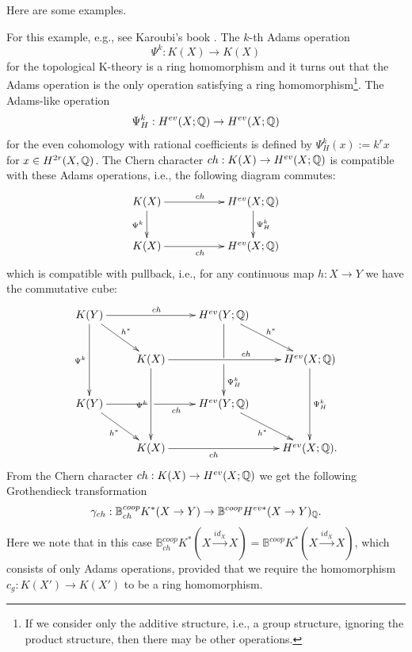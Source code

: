 \documentclass[a4paper]{amsart}
\begin{document}
Here are some examples.
\begin{ex}\label{Adam} For this example, e.g., see Karoubi's book \cite[IV, 7.13 Theorem and V, 3.37 Theorem]{Kar}.
The $k$-th Adams operation 
$$\Psi^k:K(X) \to K(X)$$
 for the topological K-theory is a ring homomorphism and it turns out that the Adams operation is the only operation satisfying a ring homomorphism\footnote{If we consider only the additive structure, i.e., a group structure, ignoring the product structure, then there may be other operations.}. The Adams-like operation 
$$\Psi^k_H:H^{ev}(X;\mathbb Q) \to H^{ev}(X;\mathbb Q)$$
 for the even cohomology with rational coefficients is defined by
 $\Psi^k_H(x) := k^r x$ for $x \in H^{2r}(X, \mathbb Q)$. The Chern character $ch:K(X) \to H^{ev}(X ;\mathbb Q)$ is compatible with these Adams operations, i.e., the following diagram commutes:
$$
\xymatrix
{
K(X) \ar[d]_{\Psi^k}\ar[rr]^{ch}  && H^{ev}(X;\bQ) \ar[d]^{\Psi^k_H}\\
K(X) \ar[rr]_{ch} && H^{ev}(X;\bQ)
}
$$
which is compatible with pullback, i.e., for any continuous map $h:X \to Y$ we have the commutative cube:
\begin{equation*}
\xymatrix
{ K(Y) \ar[dd]_{\Psi^k } \ar[rd]^{h^*} \ar[rr]^{ch} && H^{ev}(Y;\bQ) \ar'[d][dd]^{\Psi^k_H} \ar[rd]^{h^*} \\
& K(X) \ar[dd]_{\Psi^k} \ar[rr]^{ \hspace{1cm} ch}  &&  H^{ev}(X;\bQ)\ar[dd]^{\Psi^k_H} \\
K(Y)\ar'[r] [rr]_{ch \quad \quad }  \ar[rd]_{h^*} && H^{ev}(Y;\bQ)\ar[rd]_{h^*} \\
& K(X) \ar[rr] _{ch \quad \quad  \quad }  &&  H^{ev}(X;\bQ).
}
\end{equation*}
 From the Chern character $ch:K(X) \to H^{ev}(X ;\mathbb Q)$ we get the following Grothendieck transformation
$$\gamma_{ch}: \mathbb B^{coop}_{ch} K^*(X \to Y)  \to  \mathbb B^{coop} H^{ev *}(X \to Y)_{\mathbb Q}.$$
Here we note that in this case $\mathbb B^{coop}_{ch} K^*(X \xrightarrow {id_X} X) = \mathbb B^{coop} K^*(X \xrightarrow {id_X} X)$, which consists of only Adams operations, provided that we require the homomorphism $c_g:K(X') \to K(X')$ to be a ring homomorphism. 
\end{ex}
\end{document}
